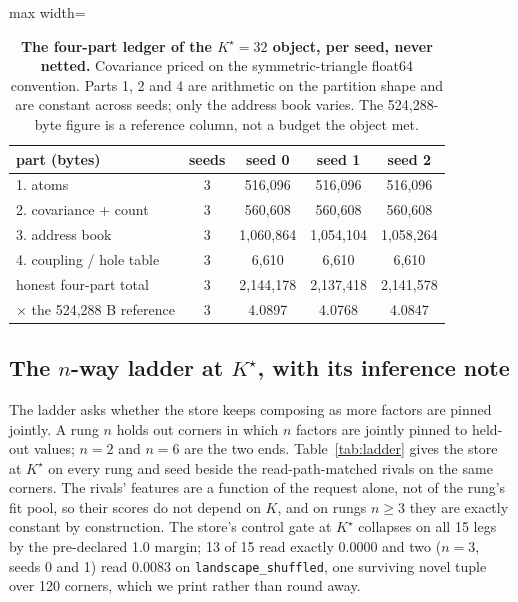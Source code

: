 \documentclass{article} %
\newcommand{\Kstar}{\ensuremath{K^{\star}}}
\begin{document}
\begin{table}[t]
\centering\small
\caption{\textbf{The four-part ledger of the $\Kstar=32$ object, per seed, never netted.}
Covariance priced on the symmetric-triangle float64 convention. Parts 1, 2 and 4 are
arithmetic on the partition shape and are constant across seeds; only the address book varies.
The 524,288-byte figure is a reference column, not a budget the object met.}
\label{tab:ledger-kstar}
\begin{adjustbox}{max width=\linewidth}\begin{tabular}{lcccc}
\toprule
part (bytes) & seeds & seed 0 & seed 1 & seed 2 \\
\midrule
1. atoms & 3 & 516,096 & 516,096 & 516,096 \\
2. covariance + count & 3 & 560,608 & 560,608 & 560,608 \\
3. address book & 3 & 1,060,864 & 1,054,104 & 1,058,264 \\
4. coupling / hole table & 3 & 6,610 & 6,610 & 6,610 \\
honest four-part total & 3 & 2,144,178 & 2,137,418 & 2,141,578 \\
$\times$ the 524,288 B reference & 3 & 4.0897 & 4.0768 & 4.0847 \\ %
\bottomrule
\end{tabular}\end{adjustbox}
\end{table}

\subsection{The $n$-way ladder at $\Kstar$, with its inference note}
\label{sec:ladder}

The ladder asks whether the store keeps composing as more factors are pinned jointly. A rung
$n$ holds out corners in which $n$ factors are jointly pinned to held-out values; $n=2$ and
$n=6$ are the two ends. Table~\ref{tab:ladder} gives the store at $\Kstar$ on every rung and
seed beside the read-path-matched rivals on the same corners. The rivals' features are a
function of the request alone, not of the rung's fit pool, so their scores do not depend on
$K$, and on rungs $n\ge3$ they are exactly constant by construction.
The store's control gate at $\Kstar$ collapses on all 15 legs by the pre-declared 1.0 margin;
13 of 15 read exactly 0.0000 and two ($n=3$, seeds 0 and 1) read 0.0083 on
\texttt{landscape\_shuffled}, one surviving novel tuple over 120 corners, which we print
rather than round away. %
\end{document}
